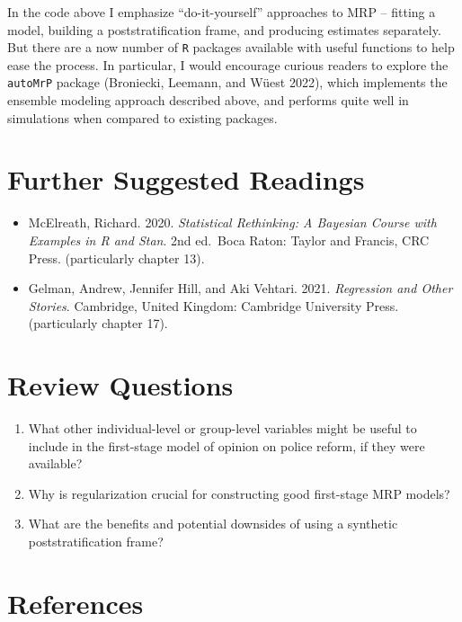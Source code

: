 \documentclass[
]{article}
\begin{document}
In the code above I emphasize ``do-it-yourself'' approaches to MRP --
fitting a model, building a poststratification frame, and producing
estimates separately. But there are a now number of \texttt{R} packages
available with useful functions to help ease the process. In particular,
I would encourage curious readers to explore the \texttt{autoMrP}
package (Broniecki, Leemann, and Wüest 2022), which implements the
ensemble modeling approach described above, and performs quite well in
simulations when compared to existing packages.

\hypertarget{further-suggested-readings}{%
\section{Further Suggested Readings}\label{further-suggested-readings}}

\begin{itemize}
\item
  McElreath, Richard. 2020. \emph{Statistical Rethinking: A Bayesian
  Course with Examples in R and Stan}. 2nd ed.~Boca Raton: Taylor and
  Francis, CRC Press. (particularly chapter 13).
\item
  Gelman, Andrew, Jennifer Hill, and Aki Vehtari. 2021. \emph{Regression
  and Other Stories}. Cambridge, United Kingdom: Cambridge University
  Press. (particularly chapter 17).
\end{itemize}

\hypertarget{review-questions}{%
\section{Review Questions}\label{review-questions}}

\begin{enumerate}
\def\labelenumi{\arabic{enumi}.}
\item
  What other individual-level or group-level variables might be useful
  to include in the first-stage model of opinion on police reform, if
  they were available?
\item
  Why is regularization crucial for constructing good first-stage MRP
  models?
\item
  What are the benefits and potential downsides of using a synthetic
  poststratification frame?
\end{enumerate}

\hypertarget{references}{%
\section*{References}\label{references}}
\end{document}
